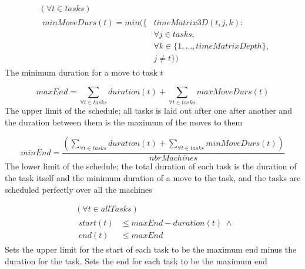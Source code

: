  
 \begin{equation}
 \begin{aligned}\label{eq:58}
 &(\forall t \in tasks)\\
 &\begin{aligned}
 minMoveDurs(t) = min(\{&timeMatrix3D(t,j,k) :\\
 &\forall j \in tasks, \\
 &\forall k \in \{1 , \ldots , timeMatrixDepth\},\\
 &j \neq t\})
 \end{aligned}
 \end{aligned}
 \end{equation}
 The minimum duration for a move to task $t$
 
 \begin{equation}\label{eq:59}
 maxEnd = \sum_{\forall t \in tasks} duration(t) + \sum_{\forall t \in tasks} maxMoveDurs(t)
 \end{equation}
 The upper limit of the schedule; all tasks is laid out after one after another and the duration between them is the maximum of the moves to them
 
 \begin{equation}\label{eq:60}
 minEnd = \frac{\left(\sum_{\forall t \in tasks} duration(t) + \sum_{\forall t \in tasks} minMoveDurs(t)\right)}{nbrMachines}
 \end{equation}
 The lower limit of the schedule; the total duration of each task is the duration of the task itself and the minimum duration of a move to the task, and the tasks are scheduled perfectly over all the machines
 
 \begin{equation}\label{eq:61}
 \begin{aligned}
 &(\forall t \in allTasks)\\
 &\begin{aligned}
 start(t) &\le maxEnd-duration(t) \; \land\\
 end(t) &\le maxEnd
 \end{aligned}
 \end{aligned}
 \end{equation}
 Sets the upper limit for the start of each task to be the maximum end minus the duration for the task. Sets the end for each task to be the maximum end
 
